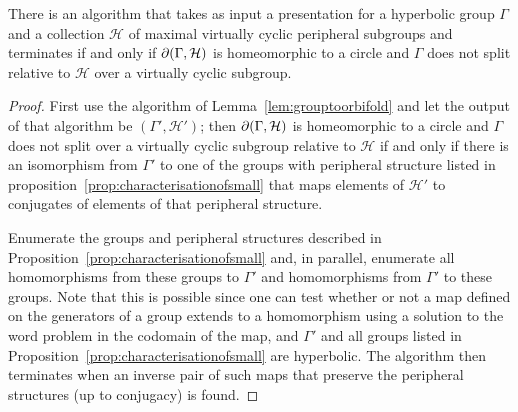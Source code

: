 \begin{lem}\label{lem:identifyingsmallorbifolds} There is an algorithm that
  takes as input a presentation for a hyperbolic group $\Gamma$ and a
  collection $\mathcal{H}$ of maximal virtually cyclic peripheral subgroups and
  terminates if and only if $\partial(\Gamma, \mathcal{H})$ is homeomorphic to
  a circle and $\Gamma$ does not split relative to $\mathcal{H}$ over a
  virtually cyclic subgroup.
\end{lem}

\begin{proof} First use the algorithm of Lemma~\ref{lem:grouptoorbifold} and
let the output of that algorithm be $(\Gamma', \mathcal{H}')$; then
$\partial(\Gamma, \mathcal{H})$ is homeomorphic to a circle and $\Gamma$
does not split over a virtually cyclic subgroup relative to $\mathcal{H}$ if
and only if there is an isomorphism from $\Gamma'$ to one of the groups with
peripheral structure listed in proposition~\ref{prop:characterisationofsmall}
that maps elements of $\mathcal{H}'$ to conjugates of elements of that
peripheral structure.
  
Enumerate the groups and peripheral structures described in
Proposition~\ref{prop:characterisationofsmall} and, in parallel, enumerate
all homomorphisms from these groups to $\Gamma'$ and homomorphisms from
$\Gamma'$ to these groups. Note that this is possible since one can test
whether or not a map defined on the generators of a group extends to a
homomorphism using a solution to the word problem in the codomain of the map,
and $\Gamma'$ and all groups listed in
Proposition~\ref{prop:characterisationofsmall} are hyperbolic. The algorithm
then terminates when an inverse pair of such maps that preserve the peripheral
structures (up to conjugacy) is found.  \end{proof}
